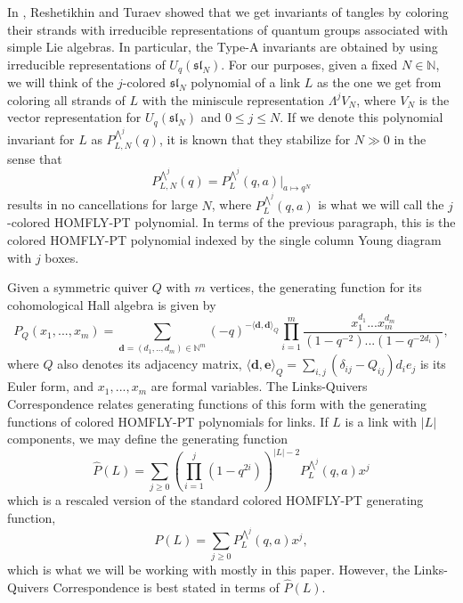 \documentclass[11pt]{amsart}
\theoremstyle{plain}
\theoremstyle{definition}
\theoremstyle{remark}
\begin{document}
In \cite{RT90}, Reshetikhin and Turaev showed that we get invariants of tangles by coloring their strands with irreducible representations of quantum groups associated with simple Lie algebras. In particular, the Type-A invariants are obtained by using irreducible representations of $U_q(\mathfrak{sl}_N)$. For our purposes, given a fixed $N\in \mathbb{N}$, we will think of the $j$-colored $\mathfrak{sl}_N$ polynomial of a link $L$ as the one we get from coloring all strands of $L$ with the miniscule representation $\Lambda^j V_N$, where $V_N$ is the vector representation for $U_q(\mathfrak{sl}_N)$ and $0\leq j\leq N$. If we denote this polynomial invariant for $L$ as $P_{L,N}^{\bigwedge^j}(q)$, it is known that they stabilize for $N\gg 0$ in the sense that 
\[
P_{L,N}^{\bigwedge^j}(q)=P_L^{\bigwedge^j}(q,a)\bigg|_{a\mapsto q^N}
\]
results in no cancellations for large $N$, where $P_L^{\bigwedge^j}(q,a)$ is what we will call the $j$-colored HOMFLY-PT polynomial. In terms of the previous paragraph, this is the colored HOMFLY-PT polynomial indexed by the single column Young diagram with $j$ boxes.

Given a symmetric quiver $Q$ with $m$ vertices, the generating function for its cohomological Hall algebra is given by
\begin{equation}
P_Q(x_1,...,x_m) = \sum_{\textbf{d}=(d_1,..,d_m)\in\mathbb{N}^m} (-q)^{-\langle \textbf{d},\textbf{d}\rangle_Q}\prod_{i=1}^m \frac{x_1^{d_1}...x_m^{d_m}}{(1-q^{-2})...(1-q^{-2d_i})},
\end{equation}
where $Q$ also denotes its adjacency matrix, $\langle \textbf{d},\textbf{e}\rangle_Q = \sum_{i,j}(\delta_{ij}- Q_{ij})d_ie_j$ is its Euler form, and $x_1,...,x_m$ are formal variables. The Links-Quivers Correspondence relates generating functions of this form with the generating functions of colored HOMFLY-PT polynomials for links. If $L$ is a link with $|L|$ components, we may define the generating function
\begin{equation}
    \widehat{P}(L)=\sum_{j\geq 0}\left(\prod_{i=1}^j(1-q^{2i})\right)^{|L|-2}P^{\bigwedge^j}_L(q,a)x^j
\end{equation}
which is a rescaled version of the standard colored HOMFLY-PT generating function,
\begin{equation}
    P(L)=\sum_{j\geq 0}P^{\bigwedge^j}_L(q,a)x^j,
\end{equation}
which is what we will be working with mostly in this paper. However, the Links-Quivers Correspondence is best stated in terms of $\widehat{P}(L)$.
\end{document}
